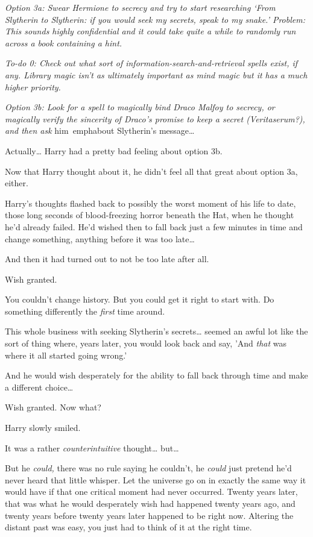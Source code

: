 \emph{Option 3a: Swear Hermione to secrecy and try to start researching `From 
Slytherin to Slytherin: if you would seek my secrets, speak to my snake.' 
Problem: This sounds highly confidential and it could take quite a while to 
randomly run across a book containing a hint.}

\emph{To-do 0: Check out what sort of information-search-and-retrieval spells 
exist, if any. Library magic isn't as ultimately important as mind magic but it 
has a much higher priority.}

\emph{Option 3b: Look for a spell to magically bind Draco Malfoy to secrecy, or 
magically verify the sincerity of Draco's promise to keep a secret 
(Veritaserum?), and then ask} him\ emph{about Slytherin's message{\ldots}}

Actually{\ldots} Harry had a pretty bad feeling about option 3b.

Now that Harry thought about it, he didn't feel all that great about option 3a, 
either.

Harry's thoughts flashed back to possibly the worst moment of his life to date, 
those long seconds of blood-freezing horror beneath the Hat, when he thought 
he'd already failed. He'd wished then to fall back just a few minutes in time 
and change something, anything before it was too late{\ldots}

And then it had turned out to not be too late after all.

Wish granted.

You couldn't change history. But you could get it right to start with. Do 
something differently the \emph{first} time around.

This whole business with seeking Slytherin's secrets{\ldots} seemed an awful 
lot like the sort of thing where, years later, you would look back and say, 
'And \emph{that} was where it all started going wrong.'

And he would wish desperately for the ability to fall back through time and 
make a different choice{\ldots}

Wish granted. Now what?

Harry slowly smiled.

It was a rather \emph{counterintuitive} thought{\ldots} but{\ldots}

But he \emph{could,} there was no rule saying he couldn't, he \emph{could} just 
pretend he'd never heard that little whisper. Let the universe go on in exactly 
the same way it would have if that one critical moment had never occurred. 
Twenty years later, that was what he would desperately wish had happened twenty 
years ago, and twenty years before twenty years later happened to be right now. 
Altering the distant past was easy, you just had to think of it at the right 
time.


